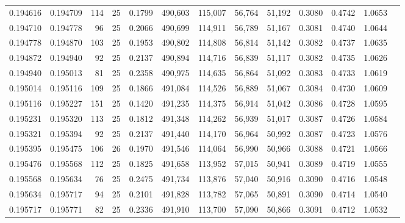 \begin{tabular}{rrrrrrrrrrrrr}
0.194616 & 0.194709 &   114 &  25 &                                     0.1799 & 490,603 & 115,007 &  56,764 &  51,192 & 0.3080 & 0.4742 & 1.0653 \\
0.194710 & 0.194778 &    96 &  25 &                                     0.2066 & 490,699 & 114,911 &  56,789 &  51,167 & 0.3081 & 0.4740 & 1.0644 \\
0.194778 & 0.194870 &   103 &  25 &                                     0.1953 & 490,802 & 114,808 &  56,814 &  51,142 & 0.3082 & 0.4737 & 1.0635 \\
0.194872 & 0.194940 &    92 &  25 &                                     0.2137 & 490,894 & 114,716 &  56,839 &  51,117 & 0.3082 & 0.4735 & 1.0626 \\
0.194940 & 0.195013 &    81 &  25 &                                     0.2358 & 490,975 & 114,635 &  56,864 &  51,092 & 0.3083 & 0.4733 & 1.0619 \\
0.195014 & 0.195116 &   109 &  25 &                                     0.1866 & 491,084 & 114,526 &  56,889 &  51,067 & 0.3084 & 0.4730 & 1.0609 \\
0.195116 & 0.195227 &   151 &  25 &                                     0.1420 & 491,235 & 114,375 &  56,914 &  51,042 & 0.3086 & 0.4728 & 1.0595 \\
0.195231 & 0.195320 &   113 &  25 &                                     0.1812 & 491,348 & 114,262 &  56,939 &  51,017 & 0.3087 & 0.4726 & 1.0584 \\
0.195321 & 0.195394 &    92 &  25 &                                     0.2137 & 491,440 & 114,170 &  56,964 &  50,992 & 0.3087 & 0.4723 & 1.0576 \\
0.195395 & 0.195475 &   106 &  26 &                                     0.1970 & 491,546 & 114,064 &  56,990 &  50,966 & 0.3088 & 0.4721 & 1.0566 \\
0.195476 & 0.195568 &   112 &  25 &                                     0.1825 & 491,658 & 113,952 &  57,015 &  50,941 & 0.3089 & 0.4719 & 1.0555 \\
0.195568 & 0.195634 &    76 &  25 &                                     0.2475 & 491,734 & 113,876 &  57,040 &  50,916 & 0.3090 & 0.4716 & 1.0548 \\
0.195634 & 0.195717 &    94 &  25 &                                     0.2101 & 491,828 & 113,782 &  57,065 &  50,891 & 0.3090 & 0.4714 & 1.0540 \\
0.195717 & 0.195771 &    82 &  25 &                                     0.2336 & 491,910 & 113,700 &  57,090 &  50,866 & 0.3091 & 0.4712 & 1.0532 \\

\end{tabular}
